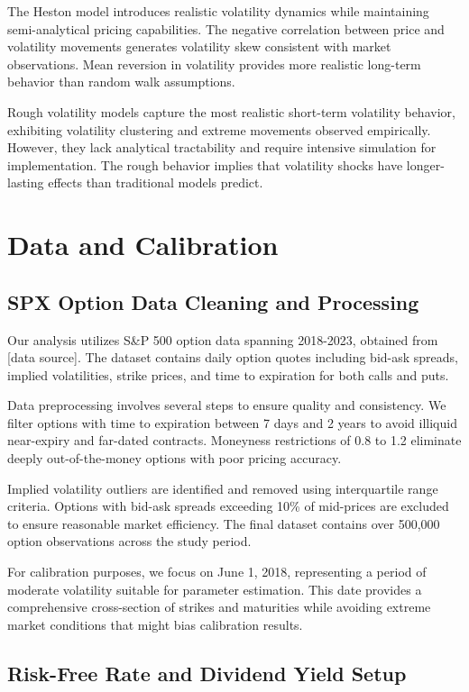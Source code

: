 \documentclass[12pt,a4paper]{report}
\begin{document}
The Heston model introduces realistic volatility dynamics while maintaining semi-analytical pricing capabilities. The negative correlation between price and volatility movements generates volatility skew consistent with market observations. Mean reversion in volatility provides more realistic long-term behavior than random walk assumptions.

Rough volatility models capture the most realistic short-term volatility behavior, exhibiting volatility clustering and extreme movements observed empirically. However, they lack analytical tractability and require intensive simulation for implementation. The rough behavior implies that volatility shocks have longer-lasting effects than traditional models predict.

\chapter{Data and Calibration}

\section{SPX Option Data Cleaning and Processing}

Our analysis utilizes S\&P 500 option data spanning 2018-2023, obtained from [data source]. The dataset contains daily option quotes including bid-ask spreads, implied volatilities, strike prices, and time to expiration for both calls and puts.

Data preprocessing involves several steps to ensure quality and consistency. We filter options with time to expiration between 7 days and 2 years to avoid illiquid near-expiry and far-dated contracts. Moneyness restrictions of 0.8 to 1.2 eliminate deeply out-of-the-money options with poor pricing accuracy.

Implied volatility outliers are identified and removed using interquartile range criteria. Options with bid-ask spreads exceeding 10\% of mid-prices are excluded to ensure reasonable market efficiency. The final dataset contains over 500,000 option observations across the study period.

For calibration purposes, we focus on June 1, 2018, representing a period of moderate volatility suitable for parameter estimation. This date provides a comprehensive cross-section of strikes and maturities while avoiding extreme market conditions that might bias calibration results.

\section{Risk-Free Rate and Dividend Yield Setup}
\end{document}
